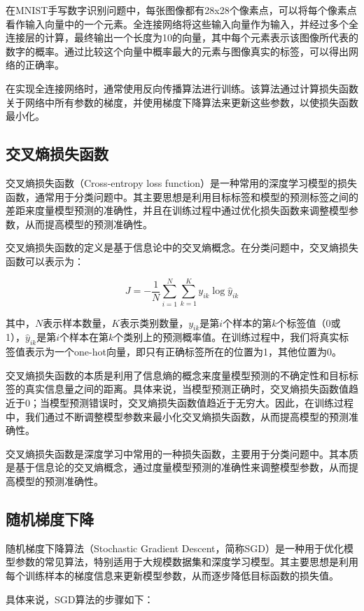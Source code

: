 \documentclass{report}
\begin{document}
	在MNIST手写数字识别问题中，每张图像都有28x28个像素点，可以将每个像素点看作输入向量中的一个元素。全连接网络将这些输入向量作为输入，并经过多个全连接层的计算，最终输出一个长度为10的向量，其中每个元素表示该图像所代表的数字的概率。通过比较这个向量中概率最大的元素与图像真实的标签，可以得出网络的正确率。
	
	在实现全连接网络时，通常使用反向传播算法进行训练。该算法通过计算损失函数关于网络中所有参数的梯度，并使用梯度下降算法来更新这些参数，以使损失函数最小化。
	
	
	\subsection{交叉熵损失函数}
	交叉熵损失函数（Cross-entropy loss function）是一种常用的深度学习模型的损失函数，通常用于分类问题中。其主要思想是利用目标标签和模型的预测标签之间的差距来度量模型预测的准确性，并且在训练过程中通过优化损失函数来调整模型参数，从而提高模型的预测准确性。
	
	交叉熵损失函数的定义是基于信息论中的交叉熵概念。在分类问题中，交叉熵损失函数可以表示为：
	
	$$J=-\frac{1}{N}\sum_{i=1}^{N}\sum_{k=1}^{K}y_{ik}\log{\hat{y}_{ik}}$$
	
	其中，$N$表示样本数量，$K$表示类别数量，$y_{ik}$是第$i$个样本的第$k$个标签值（0或1），$\hat{y}_{ik}$是第$i$个样本在第$k$个类别上的预测概率值。在训练过程中，我们将真实标签值表示为一个one-hot向量，即只有正确标签所在的位置为1，其他位置为0。
	
	交叉熵损失函数的本质是利用了信息熵的概念来度量模型预测的不确定性和目标标签的真实信息量之间的距离。具体来说，当模型预测正确时，交叉熵损失函数值趋近于0；当模型预测错误时，交叉熵损失函数值趋近于无穷大。因此，在训练过程中，我们通过不断调整模型参数来最小化交叉熵损失函数，从而提高模型的预测准确性。
	
	交叉熵损失函数是深度学习中常用的一种损失函数，主要用于分类问题中。其本质是基于信息论的交叉熵概念，通过度量模型预测的准确性来调整模型参数，从而提高模型的预测准确性。
	
	\subsection{随机梯度下降}
	随机梯度下降算法（Stochastic Gradient Descent，简称SGD）是一种用于优化模型参数的常见算法，特别适用于大规模数据集和深度学习模型。其主要思想是利用每个训练样本的梯度信息来更新模型参数，从而逐步降低目标函数的损失值。
	
	具体来说，SGD算法的步骤如下：
	
\end{document}
